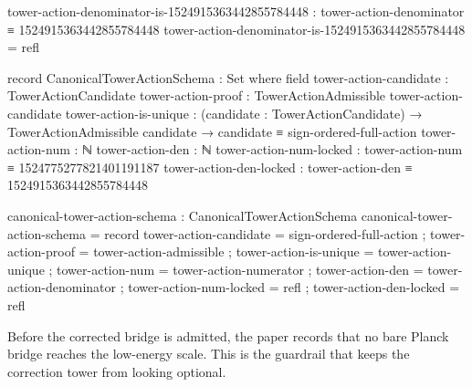 \documentclass[11pt]{article}
\begin{document}
\begin{code}
tower-action-denominator-is-1524915363442855784448 :
  tower-action-denominator ≡ 1524915363442855784448
tower-action-denominator-is-1524915363442855784448 = refl

record CanonicalTowerActionSchema : Set where
  field
    tower-action-candidate : TowerActionCandidate
    tower-action-proof     : TowerActionAdmissible tower-action-candidate
    tower-action-is-unique :
      (candidate : TowerActionCandidate) →
      TowerActionAdmissible candidate → candidate ≡ sign-ordered-full-action
    tower-action-num       : ℕ
    tower-action-den       : ℕ
    tower-action-num-locked : tower-action-num ≡ 1524775277821401191187
    tower-action-den-locked : tower-action-den ≡ 1524915363442855784448

canonical-tower-action-schema : CanonicalTowerActionSchema
canonical-tower-action-schema = record
  { tower-action-candidate = sign-ordered-full-action
  ; tower-action-proof     = tower-action-admissible
  ; tower-action-is-unique = tower-action-unique
  ; tower-action-num       = tower-action-numerator
  ; tower-action-den       = tower-action-denominator
  ; tower-action-num-locked = refl
  ; tower-action-den-locked = refl
  }
\end{code}

Before the corrected bridge is admitted, the paper records that no bare
Planck bridge reaches the low-energy scale.  This is the guardrail that keeps
the correction tower from looking optional.
\end{document}
